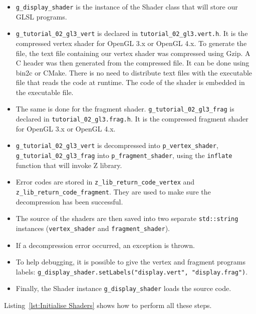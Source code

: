 \documentclass[11pt,oneside,a4paper,final]{article}
\begin{document}
\begin{itemize}
\item \verb+g_display_shader+ is the instance of the Shader class that will store our GLSL programs. 

\item \verb+g_tutorial_02_gl3_vert+  is declared in \verb+tutorial_02_gl3.vert.h+. 
 It is the compressed vertex shader for OpenGL 3.x or OpenGL 4.x. 
 To generate the file, the text file containing our vertex shader was compressed using Gzip. 
 A C header was then generated from the compressed file. 
 It can be done using bin2c or CMake. 
 There is no need to distribute text files with the executable file that reads the code at runtime. 
 The code of the shader is embedded in the executable file. 

\item  The same is done for the fragment shader.  
\verb+g_tutorial_02_gl3_frag+  is declared in \verb+tutorial_02_gl3.frag.h+. 
 It is the compressed fragment shader for OpenGL 3.x or OpenGL 4.x.

\item \verb+g_tutorial_02_gl3_vert+ is decompressed into \verb+p_vertex_shader+, 
\verb+g_tutorial_02_gl3_frag+ into \verb+p_fragment_shader+, using the \verb+inflate+ function that will invoke Z library. 

\item Error codes are stored in \verb+z_lib_return_code_vertex+ and \verb+z_lib_return_code_fragment+. 
They are used to make sure the decompression has been successful. 

\item The source of the shaders are then saved into two separate \verb+std::string+ instances (\verb+vertex_shader+ and \verb+fragment_shader+). 

\item If a decompression error occurred, an exception is thrown. 

\item To help debugging, it is possible to give the vertex and fragment programs labels: 
\verb+g_display_shader.setLabels("display.vert", "display.frag")+. 

\item Finally, the Shader instance \verb+g_display_shader+ loads the source code. 
\end{itemize}
Listing~\ref{lst:Initialise Shaders} shows how to perform all these steps.
\begin{center}

\end{center}
\end{document}
